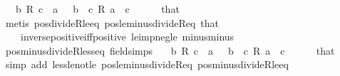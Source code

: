 \begin{isabellebody}
\ \ {\isachardoublequoteopen}{\isacharminus}{\kern0pt}\ {\isacharparenleft}{\kern0pt}b\ {\isacharslash}{\kern0pt}\isactrlsub R\ c{\isacharparenright}{\kern0pt}\ {\isasymle}\ a\ {\isasymlongleftrightarrow}\ {\isacharminus}{\kern0pt}\ b\ {\isasymle}\ c\ {\isacharasterisk}{\kern0pt}\isactrlsub R\ a{\isachardoublequoteclose}\ \ {\isachardoublequoteopen}c\ {\isachargreater}{\kern0pt}\ {}{\isachardoublequoteclose}\isanewline
%
\isadelimproof
\ \ %
\endisadelimproof
%
\isatagproof
{}\isamarkupfalse%
\ that\ \isamarkupfalse%
\ {\isacharparenleft}{\kern0pt}metis\ pos{\isacharunderscore}{\kern0pt}divideR{\isacharunderscore}{\kern0pt}le{\isacharunderscore}{\kern0pt}eq\ pos{\isacharunderscore}{\kern0pt}le{\isacharunderscore}{\kern0pt}minus{\isacharunderscore}{\kern0pt}divideR{\isacharunderscore}{\kern0pt}eq\ that\isanewline
\ \ \ \ inverse{\isacharunderscore}{\kern0pt}positive{\isacharunderscore}{\kern0pt}iff{\isacharunderscore}{\kern0pt}positive\ le{\isacharunderscore}{\kern0pt}imp{\isacharunderscore}{\kern0pt}neg{\isacharunderscore}{\kern0pt}le\ minus{\isacharunderscore}{\kern0pt}minus{\isacharparenright}{\kern0pt}%
\endisatagproof
{\isafoldproof}%
%
\isadelimproof
\isanewline
%
\endisadelimproof
\isanewline
{}\isamarkupfalse%
\ pos{\isacharunderscore}{\kern0pt}minus{\isacharunderscore}{\kern0pt}divideR{\isacharunderscore}{\kern0pt}less{\isacharunderscore}{\kern0pt}eq\ {\isacharbrackleft}{\kern0pt}field{\isacharunderscore}{\kern0pt}simps{\isacharbrackright}{\kern0pt}{\isacharcolon}{\kern0pt}\isanewline
\ \ {\isachardoublequoteopen}{\isacharminus}{\kern0pt}\ {\isacharparenleft}{\kern0pt}b\ {\isacharslash}{\kern0pt}\isactrlsub R\ c{\isacharparenright}{\kern0pt}\ {\isacharless}{\kern0pt}\ a\ {\isasymlongleftrightarrow}\ {\isacharminus}{\kern0pt}\ b\ {\isacharless}{\kern0pt}\ c\ {\isacharasterisk}{\kern0pt}\isactrlsub R\ a{\isachardoublequoteclose}\ \ {\isachardoublequoteopen}c\ {\isachargreater}{\kern0pt}\ {}{\isachardoublequoteclose}\isanewline
%
\isadelimproof
\ \ %
\endisadelimproof
%
\isatagproof
{}\isamarkupfalse%
\ that\ \isamarkupfalse%
\ {\isacharparenleft}{\kern0pt}simp\ add{\isacharcolon}{\kern0pt}\ less{\isacharunderscore}{\kern0pt}le{\isacharunderscore}{\kern0pt}not{\isacharunderscore}{\kern0pt}le\ pos{\isacharunderscore}{\kern0pt}le{\isacharunderscore}{\kern0pt}minus{\isacharunderscore}{\kern0pt}divideR{\isacharunderscore}{\kern0pt}eq\ pos{\isacharunderscore}{\kern0pt}minus{\isacharunderscore}{\kern0pt}divideR{\isacharunderscore}{\kern0pt}le{\isacharunderscore}{\kern0pt}eq{\isacharparenright}{\kern0pt}%

\end{isabellebody}
